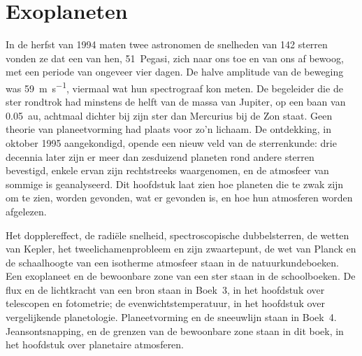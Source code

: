 \chapter{Exoplaneten}\label{ch:b3:exoplanets}

In de herfst van 1994 maten twee astronomen de snelheden van 142
sterren vonden ze dat een van hen, 51~Pegasi, zich naar ons toe en van ons af bewoog,
met een periode van ongeveer vier dagen. De halve amplitude van de beweging was
\qty{59}{m.s^{-1}}, viermaal wat hun spectrograaf kon meten. De
begeleider die de ster rondtrok had minstens de helft van de massa van
Jupiter, op een baan van \qty{0.05}{au}, achtmaal dichter bij zijn ster
dan Mercurius bij de Zon staat. Geen theorie van planeetvorming had plaats voor
zo'n lichaam. De ontdekking, in oktober 1995 aangekondigd, opende een nieuw veld
van de sterrenkunde: drie decennia later zijn er meer dan zesduizend planeten rond
andere sterren bevestigd, enkele ervan zijn rechtstreeks waargenomen, en de
atmosfeer van sommige is geanalyseerd. Dit hoofdstuk laat zien hoe planeten die te zwak zijn
om te zien, worden gevonden, wat er gevonden is, en hoe hun atmosferen
worden afgelezen.

\begin{recall}
Het dopplereffect, de radiële snelheid, spectroscopische dubbelsterren, de
wetten van Kepler, het tweelichamenprobleem en zijn zwaartepunt, de wet van Planck en de
schaalhoogte van een isotherme atmosfeer staan in de natuurkundeboeken. Een
exoplaneet en de bewoonbare zone van een ster staan in de schoolboeken.
De flux en de lichtkracht van een bron staan in Boek~3, in het
hoofdstuk over telescopen en fotometrie; de evenwichtstemperatuur, in het
hoofdstuk over vergelijkende planetologie. Planeetvorming en de sneeuwlijn
staan in Boek~4. Jeansontsnapping,  en de grenzen van
de bewoonbare zone staan in dit boek, in het hoofdstuk over planetaire
atmosferen.
\end{recall}

